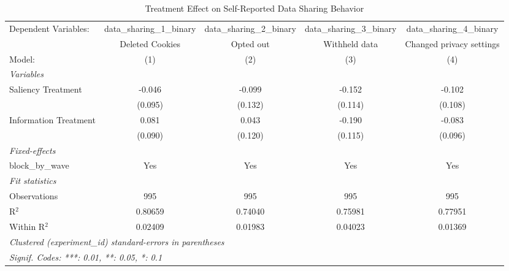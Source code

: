 
\begin{table}[htbp]
   \caption{Treatment Effect on Self-Reported Data Sharing Behavior}
   \centering
   \begin{tabular}{lcccc}
      \tabularnewline \midrule \midrule
      Dependent Variables:  & data\_sharing\_1\_binary    & data\_sharing\_2\_binary    & data\_sharing\_3\_binary    & data\_sharing\_4\_binary\\     
                            & Deleted Cookies             & Opted out                   & Withheld data               & Changed privacy settings \\   
      Model:                & (1)                         & (2)                         & (3)                         & (4)\\  
      \midrule
      \emph{Variables}\\
      Saliency Treatment    & -0.046                      & -0.099                      & -0.152                      & -0.102\\   
                            & (0.095)                     & (0.132)                     & (0.114)                     & (0.108)\\   
      Information Treatment & 0.081                       & 0.043                       & -0.190                      & -0.083\\   
                            & (0.090)                     & (0.120)                     & (0.115)                     & (0.096)\\   
      \midrule
      \emph{Fixed-effects}\\
      block\_by\_wave       & Yes                         & Yes                         & Yes                         & Yes\\  
      \midrule
      \emph{Fit statistics}\\
      Observations          & 995                         & 995                         & 995                         & 995\\  
      R$^2$                 & 0.80659                     & 0.74040                     & 0.75981                     & 0.77951\\  
      Within R$^2$          & 0.02409                     & 0.01983                     & 0.04023                     & 0.01369\\  
      \midrule \midrule
      \multicolumn{5}{l}{\emph{Clustered (experiment\_id) standard-errors in parentheses}}\\
      \multicolumn{5}{l}{\emph{Signif. Codes: ***: 0.01, **: 0.05, *: 0.1}}\\
   \end{tabular}
\end{table}


